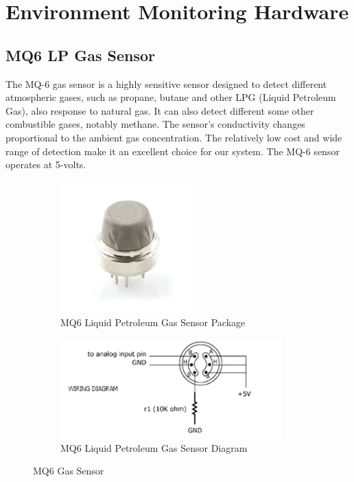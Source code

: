 \documentclass[a4paper,11pt]{report}
\begin{document}
	\section{Environment Monitoring Hardware}
	\subsection{MQ6 LP Gas Sensor}
	\par The MQ-6 gas sensor is a highly sensitive sensor designed to detect different atmospheric gases, such as propane, butane and other LPG (Liquid Petroleum Gas), also response to natural gas. It can also detect different some other combustible gases, notably methane. The sensor's conductivity changes proportional to the ambient gas concentration. The relatively low cost and wide range of detection make it an excellent choice for our system. The MQ-6 sensor operates at 5-volts.
	\begin{figure}[h!]
		\centering
		\begin{subfigure}[t]{0.45\textwidth}
			\centering
			\includegraphics[height = 2in]{mq6.png}
			\caption{MQ6 Liquid Petroleum Gas Sensor Package}
		\end{subfigure}
		\begin{subfigure}[t]{0.45\textwidth}
			\centering
			\includegraphics[height = 1.5in]{mq6diag.png}
			\caption{MQ6 Liquid Petroleum Gas Sensor Diagram}
		\end{subfigure}
	\caption{MQ6 Gas Sensor}
	\end{figure}
	\newpage
\end{document}
